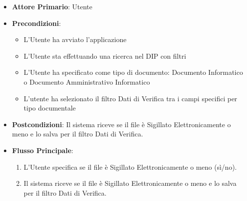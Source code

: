 \label{addValoreSigilloElettronicoPresente}
\begin{itemize}
      \item \textbf{Attore Primario}: Utente
      \item \textbf{Precondizioni}: 
      \begin{itemize}
            \item L'Utente ha avviato l'applicazione
            \item L'Utente sta effettuando una ricerca nel DIP con filtri
            \item L'Utente ha specificato come tipo di documento: Documento Informatico o Documento Amministrativo Informatico
            \item L'utente ha selezionato il filtro Dati di Verifica tra i campi specifici per tipo documentale
      \end{itemize}
      \item \textbf{Postcondizioni}: Il sistema riceve se il file è Sigillato Elettronicamente o meno e lo salva per il filtro Dati di Verifica.
      \item \textbf{Flusso Principale}:
      \begin{enumerate}
            \item L'Utente specifica se il file è Sigillato Elettronicamente o meno (sì/no).
            \item Il sistema riceve se il file è Sigillato Elettronicamente o meno e lo salva per il filtro Dati di Verifica.
      \end{enumerate}
\end{itemize}

